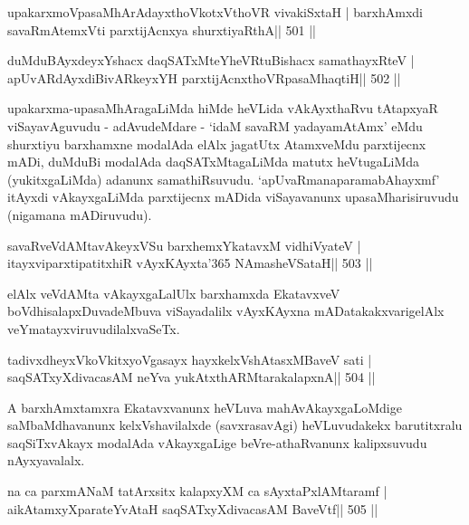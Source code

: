 
 
\begin{shl}
upakarxmoVpasaMhArAdayxthoVkotxV\s thoVR vivakiSxtaH |
barxhAmxdi savaRmAtemxVti parxtijAcnxya shurxtiyaRthA\hfill || 501 ||
\end{shl}

\begin{shl}
duMduBAyxdeyxYshacx daqSATxMteYheVRtuBishacx samathayxRteV |
apUvARdAyxdiBivARkeyxYH parxtijAcnxthoVRpasaMhaqtiH\hfill || 502 ||
\end{shl}

\begin{artha}
upakarxma-upasaMhAragaLiMda hiMde heVLida vAkAyxthaRvu tAtapxyaR
viSayavAguvudu - adAvudeMdare - `idaM savaRM yadayamAtAmx' eMdu
shurxtiyu barxhamxne modalAda elAlx jagatUtx AtamxveMdu parxtijecnx
mADi, duMduBi modalAda daqSATxMtagaLiMda matutx heVtugaLiMda
(yukitxgaLiMda) adanunx samathiRsuvudu. `apUvaRmanaparamabAhayxmf'
itAyxdi vAkayxgaLiMda parxtijecnx mADida viSayavanunx
upasaMharisiruvudu (nigamana mADiruvudu).
\end{artha}

\begin{shl}
savaRveVdAMtavAkeyxVSu barxhemxYkatavxM vidhiVyateV |
itayxviparxtipatitxhiR vAyxKAyxta\char'365 NAmasheVSataH\hfill || 503 ||
\end{shl}

\begin{artha}
elAlx veVdAMta vAkayxgaLalUlx barxhamxda EkatavxveV boVdhisalapxDuvadeMbuva viSayadalilx vAyxKAyxna mADatakakxvarigelAlx veYmatayxviruvudilalxvaSeTx.
\end{artha}

\begin{shl}
tadivxdheyxVkoVkitxyoVgasayx hayxkelxVshAtasxMBaveV sati |
saqSATxyXdivacasAM neYva yukAtx\s thARMtarakalapxnA\hfill || 504 ||
\end{shl}

\begin{artha}
A barxhAmxtamxra Ekatavxvanunx heVLuva mahAvAkayxgaLoMdige saMbaMdhavanunx kelxVshavilalxde (savxrasavAgi) heVLuvudakekx barutitxralu saqSiTxvAkayx modalAda vAkayxgaLige beVre-athaRvanunx kalipxsuvudu nAyxyavalalx.
\end{artha}

\begin{shl}
na ca parxmANaM tatArxsitx kalapxyXM ca sAyxtaPxlAMtaramf |
aikAtamxyXparateYvAtaH saqSATxyXdivacasAM BaveVtf\hfill || 505 ||
\end{shl}

